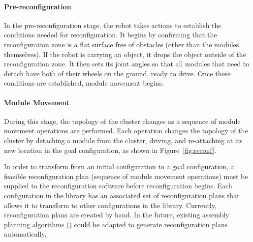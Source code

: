 \documentclass[conference]{IEEEtran}
\begin{document}
\paragraph{Pre-reconfiguration} In the pre-reconfiguration stage, the robot takes actions to establish the conditions needed for reconfiguration.  It begins by confirming that the reconfiguration zone is a flat surface free of obstacles (other than the modules themselves).  If the robot is carrying an object, it drops the object outside of the reconfiguration zone. It then  sets its joint angles so that all modules that need to detach have both of their wheels on the ground, ready to drive. Once these conditions are established, module movement begins.

\paragraph{Module Movement} During this stage, the topology of the cluster changes as a sequence of module movement operations are performed.  Each operation changes the topology of the cluster by detaching a module from the cluster, driving, and re-attaching at its new location in the goal configuration, as shown in Figure~\ref{fig:reconf}.

In order to transform from an initial configuration to a goal configuration, a feasible reconfiguration plan (sequence of module movement operations) must be supplied to the reconfiguration software before reconfiguration begins.  Each configuration in the library has an associated set of reconfiguration plans that allows it to transform to other configurations in the library.  Currently, reconfiguration plans are created by hand.  In the future, existing assembly planning algorithms (\cite{Werfel2007,Seo2013}) could be adapted to generate reconfiguration plans automatically.

\end{document}
